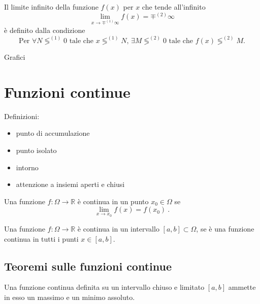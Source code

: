 \begin{definition} Il limite infinito della funzione $f(x)$ per $x$ che tende all'infinito
    \begin{equation}
        \lim_{x \rightarrow \mp^{(1)} \infty} f(x) = \mp^{(2)} \infty
    \end{equation}
    è definito dalla condizione
    \begin{equation}
        \text{Per $\forall N \lessgtr^{(1)} 0$ tale che $x \lessgtr^{(1)} N$, $\exists M \lessgtr^{(2)} 0$ tale che $f(x) \lessgtr^{(2)} M$.}
    \end{equation}
\end{definition}

{\color{red}Grafici}

\section{Funzioni continue}
{\color{red}
Definizioni:
\begin{itemize}
    \item punto di accumulazione
    \item punto isolato
    \item intorno
    \item attenzione a insiemi aperti e chiusi
\end{itemize}
}
\begin{definition} Una funzione $f: \Omega \rightarrow \mathbb{R}$ è continua in un punto $x_0 \in \Omega$ se 
    \begin{equation}
        \lim_{x \rightarrow x_0}f(x) = f(x_0) \ .
    \end{equation}
\end{definition}
\begin{definition} Una funzione $f: \Omega \rightarrow \mathbb{R}$ è continua in un intervallo $[a, b] \subset \Omega$, se è una funzione continua in tutti i punti $x \in [a, b]$.
\end{definition}

\subsection{Teoremi sulle funzioni continue}
\begin{theorem}\label{thm:weierstrass} Una funzione continua definita su un intervallo chiuso e limitato $[a, b]$ ammette in esso un massimo e un minimo assoluto.
\end{theorem}



